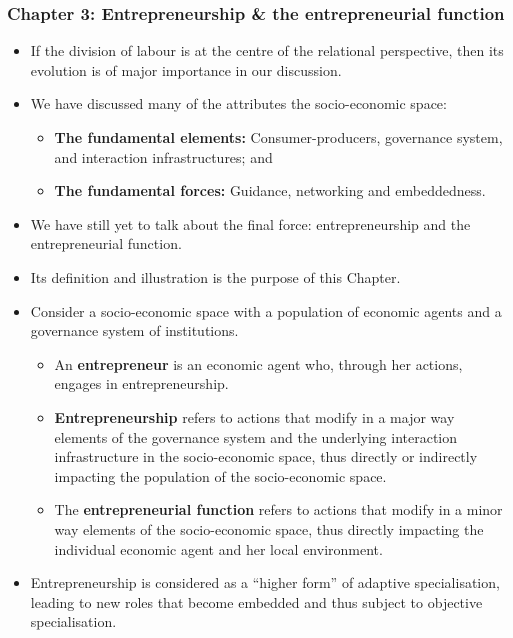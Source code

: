 \documentclass[10pt]{beamer}
\begin{document}
\begin{frame} \frametitle{Chapter 3: Entrepreneurship \& the entrepreneurial function}
\begin{itemize}
\item If the division of labour is at the centre of the relational perspective, then its evolution is of major importance in our discussion.
\medskip
\item We have discussed many of the attributes the socio-economic space: 
\begin{itemize}
\medskip
\item \textbf{The fundamental elements:} Consumer-producers, governance system, and interaction infrastructures; and 
\medskip
\item \textbf{The fundamental forces:} Guidance, networking and embeddedness.
\end{itemize}
\medskip
\item We have still yet to talk about the final force: entrepreneurship and the entrepreneurial function.
\medskip
\item Its definition and illustration is the purpose of this Chapter.
\end{itemize}
\end{frame}


\begin{frame}
\begin{itemize}
\item Consider a socio-economic space with a population of economic agents and a governance system of institutions.
\begin{itemize}
\medskip
\item An \textbf{entrepreneur} is an economic agent who, through her actions, engages in entrepreneurship.
\medskip
\item \textbf{Entrepreneurship} refers to actions that modify in a major way elements of the governance system and the underlying interaction infrastructure in the socio-economic space, thus directly or indirectly impacting the population of the socio-economic space.
\medskip
\item The \textbf{entrepreneurial function} refers to actions that modify in a minor way elements of the socio-economic space, thus directly impacting the individual economic agent and her local environment.
\end{itemize}
\medskip
\item Entrepreneurship is considered as a ``higher form'' of adaptive specialisation, leading to new roles that become embedded and thus subject to objective specialisation.
\end{itemize}
\end{frame}
\end{document}

